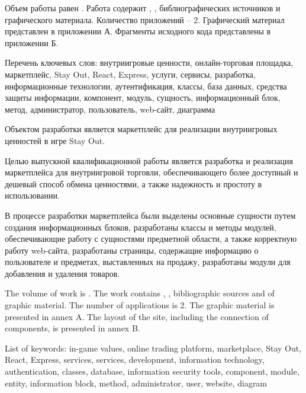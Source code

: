
Объем работы равен . Работа содержит , ,  библиографических источников и  графического материала. Количество приложений – 2. Графический материал представлен в приложении А. Фрагменты исходного кода представлены в приложении Б.

Перечень ключевых слов: внутриигровые ценности, онлайн-торговая площадка, маркетплейс, Stay Out, React, Express, услуги, сервисы, разработка, информационные технологии, аутентификация, классы, база данных, средства защиты информации, компонент, модуль, сущность, информационный блок, метод, администратор, пользователь, web-сайт, диаграмма

Объектом разработки является маркетплейс для реализации внутриигровых ценностей в игре Stay Out.

Целью выпускной квалификационной работы является разработка и реализация маркетплейса для внутриигровой торговли, обеспечивающего более доступный и дешевый способ обмена ценностями, а также надежность и простоту в использовании.

В процессе разработки маркетплейса были выделены основные сущности путем создания информационных блоков, разработаны классы и методы модулей, обеспечивающие работу с сущностями предметной области, а также корректную работу web-сайта, разработаны страницы, содержащие информацию о пользователе и предметах, выставленных на продажу, разработаны модули для добавления и удаления товаров.

  
The volume of work is . The work contains , ,  bibliographic sources and  of graphic material. The number of applications is 2. The graphic material is presented in annex A. The layout of the site, including the connection of components, is presented in annex B.

List of keywords: in-game values, online trading platform, marketplace, Stay Out, React, Express, services, services, development, information technology, authentication, classes, database, information security tools, component, module, entity, information block, method, administrator, user, website, diagram

